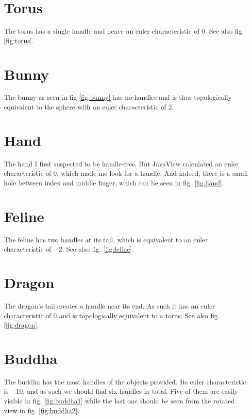 \documentclass[a4paper,10pt,notitlepage]{scrreprt}
\begin{document}
\section{Torus}

The torus has a single handle and hence an euler characteristic of $0$. See
also fig. \ref{fig:torus}.

\section{Bunny}

The bunny as seen in fig \ref{fig:bunny} has no handles and is thus
topologically equivalent to the sphere with an euler characteristic of $2$.

\section{Hand}

The hand I first suspected to be handle-free. But JavaView calculated an euler
characteristic of $0$, which made me look for a handle. And indeed, there is a
small hole between index and middle finger, which can be seen in fig.
\ref{fig:hand}.

\section{Feline}

The feline has two handles at its tail, which is equivalent to an euler
characteristic of $-2$. See also fig. \ref{fig:feline}.

\section{Dragon}

The dragon's tail creates a handle near its end. As such it has an euler
characteristic of $0$ and is topologically equivalent to a torus. See also fig.
\ref{fig:dragon}.

\section{Buddha}

The buddha has the most handles of the objects provided. Its euler
characteristic is $-10$, and as such we should find six handles in total. Five
of them are easily visible in fig. \ref{fig:buddha1} while the last one should
be seen from the rotated view in fig. \ref{fig:buddha2}.
\end{document}
